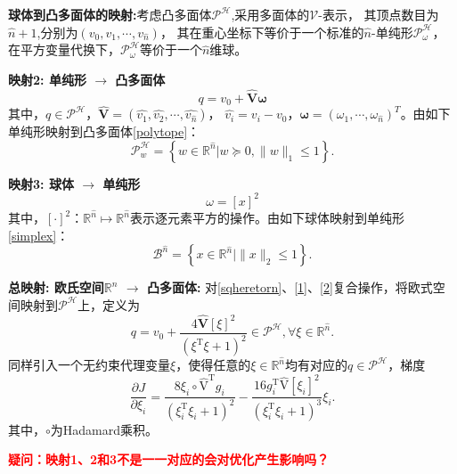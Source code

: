 \begin{tcolorbox}[green]
    \textbf{球体到凸多面体的映射:}考虑凸多面体$\mathcal{P} ^\mathcal{H}$,采用多面体的$\mathcal{V}$-表示，
    其顶点数目为$\hat{n} +1$,分别为$(v_0,v_1,\cdots ,v_{\hat{n}})$，
    其在重心坐标下等价于一个标准的$\hat{n}$-单纯形$\mathcal{P} ^\mathcal{H}_\omega $，
    在平方变量代换下，$\mathcal{P} ^\mathcal{H}_\omega $等价于一个$\hat{n}$维球。
\end{tcolorbox}
\begin{tcolorbox}[red]
    \textbf{映射2: 单纯形 $\rightarrow $ 凸多面体}
    \begin{equation}\label{1}
        q = v_0 + \mathbf{\hat{V}}\mathbf{\omega}
    \end{equation}
    其中，$q\in\mathcal{P}^\mathcal{H}$，$\mathbf{\hat{V}}= (\hat{v_1},\hat{v_2},\cdots, \hat{v_{\widehat{n}}})$，
    $\hat{v_i}= v_i-v_0$，$\mathbf{\omega}=(\omega_1,\cdots,\omega_{\widehat{n}})^T$。由如下单纯形映射到凸多面体\eqref{polytope}：
    \begin{equation}\label{simplex}
        \mathcal{P}_w^\mathcal{H}=\left\{w\in\mathbb{R}^{\hat{n}} \bigg| w\succeq0, \|w\|_1\leq1\right\}.
    \end{equation}
\end{tcolorbox}
\begin{tcolorbox}[red]
    \textbf{映射3: 球体 $\rightarrow $ 单纯形}
    \begin{equation}\label{2}
        \omega =[x]^2
    \end{equation}
    其中，$[\cdot ]^2：\mathbb{R}^{\hat{n}}\mapsto \mathbb{R}^{\hat{n}}$表示逐元素平方的操作。由如下球体映射到单纯形\eqref{simplex}：
    \begin{equation}
        \mathcal{B}^{\hat{n}}=\left\{x\in\mathbb{R}^{\hat{n}} \Big| \|x\|_2\leq1\right\}.
    \end{equation}
\end{tcolorbox}

\begin{tcolorbox}[blue]
    \textbf{总映射: 欧氏空间$\mathbb{R}^n$ $\rightarrow $ 凸多面体:}
    对\eqref{sqheretorn}、\eqref{1}、\eqref{2}复合操作，将欧式空间映射到$\mathcal{P}^{\mathcal{H}}$上，定义为
    \begin{equation}
        q=v_0+\frac{4\hat{\mathbf{V}}[\xi]^2}{(\xi^\text{T}\xi+1)^2}\in\mathcal{P}^{\mathcal{H}}, \forall \xi\in\mathbb{R}^{\hat{n}}.
    \end{equation}
    同样引入一个无约束代理变量$\xi$，使得任意的$\xi\in\mathbb{R}^{\hat{n}}$均有对应的$q\in\mathcal{P}^{\mathcal{H}}$，梯度
    \begin{equation}
        \frac{\partial J}{\partial\xi_i}=\frac{8\xi_i\circ\hat{\mathrm{V}}^\mathrm{T}g_i}{(\xi_i^\mathrm{T}\xi_i+1)^2}-\frac{16g_i^\mathrm{T}\hat{\mathrm{V}}[\xi_i]^2}{(\xi_i^\mathrm{T}\xi_i+1)^3}\xi_i.
    \end{equation}
    其中，$\circ$为Hadamard乘积。
\end{tcolorbox}
\textcolor{red}{\textbf{疑问：映射1、2和3不是一一对应的会对优化产生影响吗？}}



